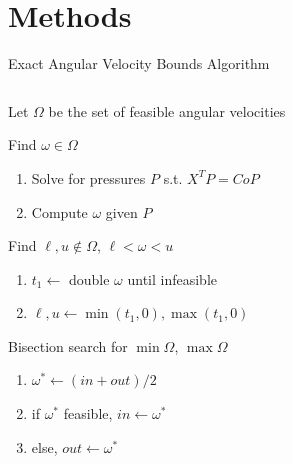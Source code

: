 \documentclass[10pt]{beamer}
\begin{document}
\section{Methods}

\begin{frame}{Exact Angular Velocity Bounds Algorithm}
  \begin{columns}[T,onlytextwidth]
    \begin{list}{}{
        \setlength{\leftmargin}{0pt}
        \setlength{\labelwidth}{0pt}
      }
    \item Let $\Omega$ be the set of feasible angular velocities
    \item Find $\omega \in \Omega$
      \begin{enumerate}
      \item Solve for pressures $P$ s.t. $X^TP = CoP$
      \item Compute $\omega$ given $P$
      \end{enumerate}
    \item Find $\ell, u \notin \Omega$, $\ell < \omega < u$
      \begin{enumerate}
      \item $t_1 \gets$ double $\omega$ until infeasible
      \item $\ell, u \gets \min(t_1,0), \max(t_1,0)$
      \end{enumerate}
    \item Bisection search for $\min\Omega$, $\max\Omega$
      \begin{enumerate}
      \item $\omega^* \gets (in + out)/2$
      \item if $\omega^*$ feasible, $in \gets \omega^*$
      \item else, $out \gets \omega^*$
      \end{enumerate}
    \end{list}


\end{columns}
\end{frame}
\end{document}
